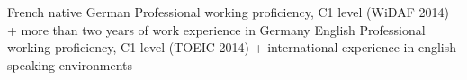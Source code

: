 

\begin{cvskills}

  \cvskill
    {French} %
    {native} %
  \cvskill
	{German} %
	{Professional working proficiency, C1 level (WiDAF 2014) + more than two years of work experience in Germany} %
  \cvskill
	{English} %
	{Professional working proficiency, C1 level (TOEIC 2014) + international experience in english-speaking environments} %
\end{cvskills}

